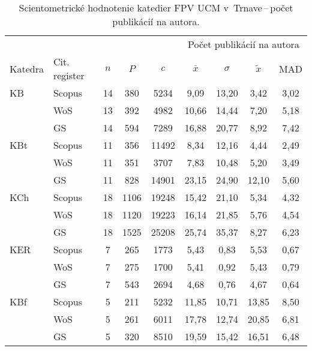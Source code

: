 \begin{table}
  \centering\small
  \caption[Hodnotenie FPV\,--\,počet publikácií na autora]%
  {Scientometrické hodnotenie katedier FPV UCM v~Trnave\,--\,počet publikácií na autora.}
  \label{tab:1-staff.results}
  \begin{tabularx}{\textwidth}{lXc@{\hspace{2.5em}}c@{\hspace{2.5em}}c@{\hspace{3.5em}}cccc}
    \toprule\noalign{\vspace{.3ex}}
    & & & & & \multicolumn{4}{c}{Počet publikácií na autora} \\
    \cmidrule{6-9}
    Katedra & Cit. register & $n$ & $P$ & $c$ & $\bar{x}$ & $\sigma$ & $\tilde{x}$ & MAD \\[0.3ex]
    \midrule\noalign{\vspace{.5ex}}
    KB   & Scopus & 14 & 380  & 5234  & 9,09  & 13,20 & 3,42  & 3,02 \\
         & WoS    & 13 & 392  & 4982  & 10,66 & 14,44 & 7,20  & 5,18 \\
         & GS     & 14 & 594  & 7289  & 16,88 & 20,77 & 8,92  & 7,42 \\[3ex]
    KBt  & Scopus & 11 & 356  & 11492 & 8,34  & 12,16 & 4,44  & 2,49 \\
         & WoS    & 11 & 351  & 3707  & 7,83  & 10,48 & 5,20  & 3,49 \\
         & GS     & 11 & 828  & 14901 & 23,15 & 24,90 & 12,10 & 5,60 \\[3ex]
    KCh  & Scopus & 18 & 1106 & 19248 & 15,42 & 21,10 & 5,34  & 4,32 \\
         & WoS    & 18 & 1120 & 19223 & 16,14 & 21,85 & 5,76  & 4,54 \\
         & GS     & 18 & 1525 & 25208 & 25,74 & 35,37 & 8,27  & 6,23 \\[3ex]
    KER  & Scopus & 7  & 265  & 1773  & 5,43  & 0,83  & 5,53  & 0,67 \\
         & WoS    & 7  & 275  & 1700  & 5,41  & 0,92  & 5,43  & 0,79 \\
         & GS     & 7  & 543  & 2694  & 4,68  & 0,76  & 4,67  & 0,64 \\[3ex]
    KBf  & Scopus & 5  & 211  & 5232  & 11,85 & 10,71 & 13,85 & 8,50 \\
         & WoS    & 5  & 261  & 6011  & 17,78 & 12,74 & 20,85 & 6,81 \\
         & GS     & 5  & 320  & 8510  & 19,59 & 15,42 & 16,51 & 6,48 \\[3ex]

\end{tabularx}
\end{table}
